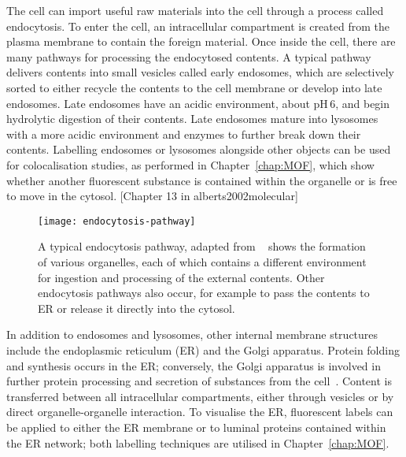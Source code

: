 The cell can import useful raw materials into the cell through a process called endocytosis. 
To enter the cell, an intracellular compartment is created from the plasma membrane to contain the foreign material.
Once inside the cell, there are many pathways for processing the endocytosed contents. 
A typical pathway delivers contents into small vesicles called early endosomes, which are selectively sorted to either recycle the contents to the cell membrane or develop into late endosomes. 
Late endosomes have an acidic environment, about pH\,6, and begin hydrolytic digestion of their contents. 
Late endosomes mature into lysosomes with a more acidic environment and enzymes to further break down their contents. 
Labelling endosomes or lysosomes alongside other objects can be used for colocalisation studies, as performed in Chapter~\ref{chap:MOF}, which show whether another fluorescent substance is contained within the organelle or is free to move in the cytosol. 
[Chapter 13 in alberts2002molecular]

\begin{figure}[htbp!]
\centering
\texttt{[image: endocytosis-pathway]}
\captionsetup{singlelinecheck=off}
\caption[Introduction: Cells import external contents through endocytosis]{A typical endocytosis pathway, adapted from ~\cite{alberts2002molecular} shows the formation of various organelles, each of which contains a different environment for ingestion and processing of the external contents. Other endocytosis pathways also occur, for example to pass the contents to ER or release it directly into the cytosol. }
\label{fig:endocytosis-pathway}
\end{figure}

In addition to endosomes and lysosomes, other internal membrane structures include the endoplasmic reticulum (ER) and the Golgi apparatus. 
Protein folding and synthesis occurs in the ER; conversely, the Golgi apparatus is involved in further protein processing and secretion of substances from the cell~\cite{dyson1978cell}. 
Content is transferred between all intracellular compartments, either through vesicles or by direct organelle-organelle interaction. 
To visualise the ER, fluorescent labels can be applied to either the ER membrane or to luminal proteins contained within the ER network; both labelling techniques are utilised in Chapter~\ref{chap:MOF}.  

